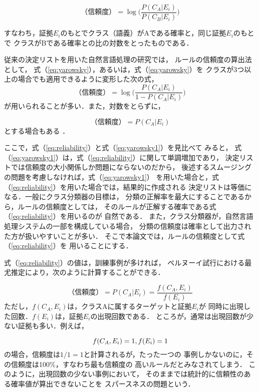 \begin{equation}
\label{eq:yarowsky}
	（信頼度）=\log\Big(\frac{P(C_A|E_i)}{P(C_B|E_i)}\Big)
\end{equation}

すなわち，証拠$E_i$のもとでクラス（語義）がAである確率と，同じ証拠$E_i$のもとで
クラスがBである確率との比の対数をとったものである．


従来の決定リストを用いた自然言語処理の研究では，
ルールの信頼度の算出法として，
式（\ref{eq:yarowsky}），あるいは，式（\ref{eq:yarowsky}）を
クラスが3つ以上の場合でも適用できるように変形した次の式，
\begin{equation}
\label{eq:yarowsky1}
	（信頼度）=\log\Big(\frac{P(C_A|E_i)}{1-P(C_A|E_i)}\Big)
\end{equation}
が用いられることが多い\cite{Yarowsky:Decision,Yarowsky:Hierarchical,新納:日本語形態素解析}．また，対数をとらずに，

\begin{equation}
\label{eq:reliability}
	（信頼度）=P(C_A|E_i)
\end{equation}
とする場合もある \cite{白木:複数決定リスト}．

ここで，式（\ref{eq:reliability}）と式（\ref{eq:yarowsky1}）を見比べて
みると，
式（\ref{eq:yarowsky1}）は，式（\ref{eq:reliability}）に関して単調増加であり，
決定リストでは信頼度の大小関係しか問題にならないのだから，
後述するスムージングの問題を考慮しなければ，式（\ref{eq:yarowsky1}）
を用いた場合と，式（\ref{eq:reliability}）を用いた場合では，結果的に作成される
決定リストは等価になる．一般にクラス分類器の目標は，
分類の正解率を最大にすることであるから，ルールの信頼度としては，
そのルールが正解する確率である式（\ref{eq:reliability}）を用いるのが
自然である．
また，クラス分類器が，自然言語処理システムの一部を構成している場合，
分類の信頼度は確率として出力された方が扱いやすいことが多い．
そこで本論文では，ルールの信頼度として式（\ref{eq:reliability}）を
用いることにする．

式（\ref{eq:reliability}）の値は，訓練事例が多ければ，
ベルヌーイ試行における最尤推定により，次のように計算することができる．

\begin{equation}
	（信頼度）=P(C_A|E_i)=\frac{f(C_A, E_i)}{f(E_i)}
\end{equation}
ただし，$f(C_A, E_i)$は，クラスAに属するターゲットと証拠$E_i$が
同時に出現した回数．$f(E_i)$は，証拠$E_i$の出現回数である．
ところが，通常は出現回数が少ない証拠も多い．例えば，

\begin{equation}
	f(C_A, E_i) = 1, \\
	f(E_i) = 1
\end{equation}
の場合，信頼度は$1/1 = 1$と計算されるが，たった一つの
事例しかないのに，その信頼度は100\%，すなわち最も信頼度の
高いルールだとみなされてしまう．
このように，出現回数の少ない事例において，
そのままでは統計的に信頼性のある確率値が算出できないことを
スパースネスの問題という．

